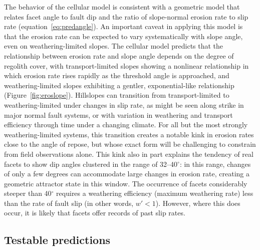 The behavior of the cellular model is consistent with a geometric model that relates facet angle to fault dip and the ratio of slope-normal erosion rate to slip rate (equation~\ref{eq:predangle}). An important caveat in applying this model is that the erosion rate can be expected to vary systematically with slope angle, even on weathering-limited slopes. The cellular model predicts that the relationship between erosion rate and slope angle depends on the degree of regolith cover, with transport-limited slopes showing a nonlinear relationship in which erosion rate rises rapidly as the threshold angle is approached, and weathering-limited slopes exhibiting a gentler, exponential-like relationship (Figure~\ref{fig:eroslope}). Hillslopes can transition from transport-limited to weathering-limited under changes in slip rate, as might be seen along strike in major normal fault systems, or with variation in weathering and transport efficiency through time under a changing climate. For all but the most strongly weathering-limited systems, this transition creates a notable kink in erosion rates close to the angle of repose, but whose exact form will be challenging to constrain from field observations alone. This kink also in part explains the tendency of real facets to show dip angles clustered in the range of 32--40$^\circ$: in this range, changes of only a few degrees can accommodate large changes in erosion rate, creating a geometric attractor state in this window. The occurrence of facets considerably steeper than 40$^\circ$ requires a weathering efficiency (maximum weathering rate) less than the rate of fault slip (in other words, $w'<1$). However, where this does occur, it is likely that facets offer records of past slip rates.

\subsection{Testable predictions}

